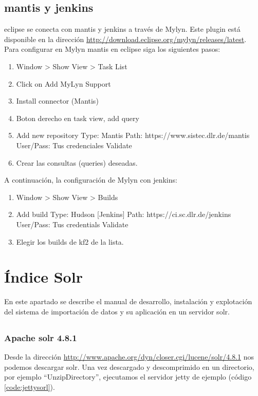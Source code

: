 \subsection{\Gls{mantis} y \gls{jenkins}}
\Gls{eclipse} se conecta con \gls{mantis} y \gls{jenkins} a través de Mylyn. Este \gls{plugin} está disponible en la dirección \url{http://download.eclipse.org/mylyn/releases/latest}.\\

Para configurar en Mylyn \gls{mantis} en \gls{eclipse} siga los siguientes pasos:
\begin{enumerate} 
	\item Window > Show View > Task List
	\item Click on Add MyLyn Support
	\item Install connector (Mantis)
	\item Boton derecho en task view, add query
	\item Add new repository
		\subitem Type: Mantis
		\subitem Path: https://www.sistec.dlr.de/mantis
		\subitem User/Pass: Tus credenciales
		\subitem Validate
	\item Crear las consultas (queries) deseadas.
\end{enumerate}

A continuación, la configuración de Mylyn con \gls{jenkins}:
\begin{enumerate}
	\item Window > Show View > Builds
	\item Add build
		\subitem Type: Hudson [Jenkins]
		\subitem Path: https://ci.sc.dlr.de/jenkins
		\subitem User/Pass: Tus credentials
		\subitem Validate
	\item Elegir los builds de \gls{kf2} de la lista.
\end{enumerate}

\section{Índice Solr}
\label{section:manualsolr}
En este apartado se describe el manual de desarrollo, instalación y explotación del sistema de importación de datos y su aplicación en un servidor \gls{solr}.

\subsection{}

\subsubsection{Apache \gls{solr} 4.8.1}
\label{subsubsection:solrinstall}
Desde la dirección \url{http://www.apache.org/dyn/closer.cgi/lucene/solr/4.8.1} nos podemos descargar \gls{solr}. Una vez descargado y descomprimido en un directorio, por ejemplo ``UnzipDirectory'', ejecutamos el servidor \gls{jetty} de ejemplo (código \ref{code:jettysorl}).\\

